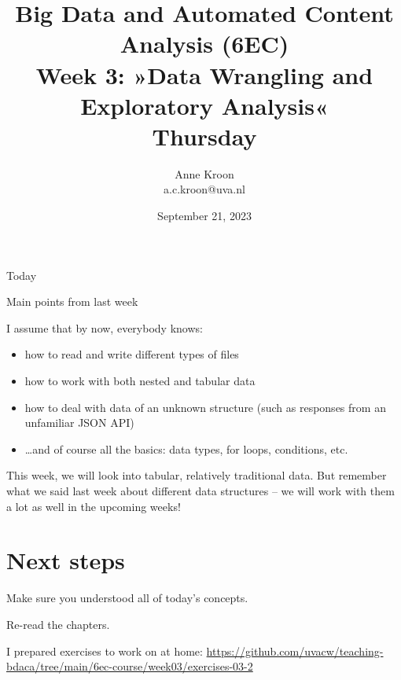 \documentclass[compress]{beamer}
\begin{document}
\title[Big Data and Automated Content Analysis]{\textbf{Big Data and Automated Content Analysis (6EC)} 
\\Week 3: »Data Wrangling and Exploratory Analysis«
\\Thursday}
\author[Anne Kroon]{Anne Kroon\\ \footnotesize{a.c.kroon@uva.nl \\}}
\date{September 21, 2023}


\begin{frame}{}
	\titlepage
\end{frame}

\begin{frame}{Today}
	\tableofcontents
\end{frame}



\begin{frame}{Main points from last week}

\begin{alertblock}{I assume that by now, everybody knows:}
\begin{itemize}
\item how to read and write different types of files
\item how to work with both nested and tabular data
\item how to deal with data of an unknown structure (such as responses from an unfamiliar JSON API)
\item \ldots and of course all the basics: data types, for loops, conditions, etc.
\end{itemize}
\end{alertblock}
\end{frame}

\begin{frame}[standout]
This week, we will look into tabular, relatively traditional data. But remember what we said last week about different data structures -- we will work with them a lot as well in the upcoming weeks!
\end{frame}







\section{Next steps}

\begin{frame}[standout]
Make sure you understood all of today's concepts.

Re-read the chapters.

I prepared exercises to work on at home:
\large{\url{https://github.com/uvacw/teaching-bdaca/tree/main/6ec-course/week03/exercises-03-2}}
\end{frame}


\begin{frame}
	\printbibliography
\end{frame}
\end{document}

